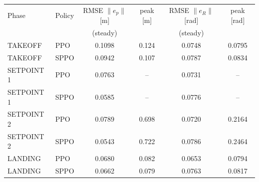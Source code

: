 \begin{tabular}{llcccc}
\toprule
Phase & Policy & RMSE $\|e_p\|$ [m] & peak [m] & RMSE $\|e_R\|$ [rad] & peak [rad] \\
 & & (steady) & & (steady) & \\
\midrule
TAKEOFF & PPO & 0.1098 & 0.124 & 0.0748 & 0.0795 \\
TAKEOFF & SPPO & 0.0942 & 0.107 & 0.0787 & 0.0834 \\
\midrule
SETPOINT 1 & PPO & 0.0763 & -- & 0.0731 & -- \\
SETPOINT 1 & SPPO & 0.0585 & -- & 0.0776 & -- \\
\midrule
SETPOINT 2 & PPO & 0.0789 & 0.698 & 0.0720 & 0.2164 \\
SETPOINT 2 & SPPO & 0.0543 & 0.722 & 0.0786 & 0.2464 \\
\midrule
LANDING & PPO & 0.0680 & 0.082 & 0.0653 & 0.0794 \\
LANDING & SPPO & 0.0662 & 0.079 & 0.0763 & 0.0817 \\
\bottomrule
\end{tabular}
